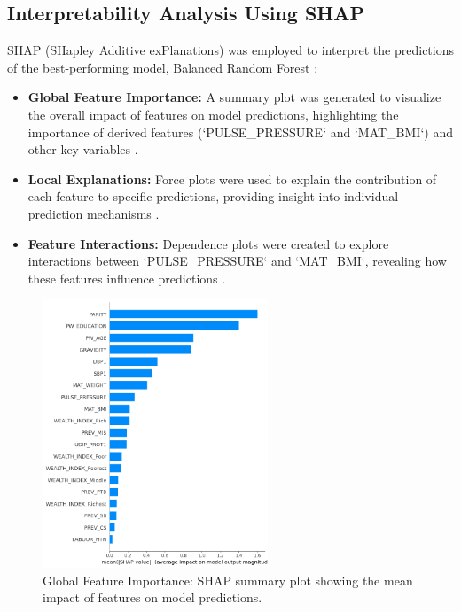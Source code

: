 \documentclass{article}
\begin{document}
\subsection{Interpretability Analysis Using SHAP}
SHAP (SHapley Additive exPlanations) was employed to interpret the predictions of the best-performing model, Balanced Random Forest \cite{wu2024}:
\begin{itemize}
    \item \textbf{Global Feature Importance:} A summary plot was generated to visualize the overall impact of features on model predictions, highlighting the importance of derived features (`PULSE\_PRESSURE` and `MAT\_BMI`) and other key variables \cite{setegn2024}.
    \item \textbf{Local Explanations:} Force plots were used to explain the contribution of each feature to specific predictions, providing insight into individual prediction mechanisms \cite{aljameel2023}.
    \item \textbf{Feature Interactions:} Dependence plots were created to explore interactions between `PULSE\_PRESSURE` and `MAT\_BMI`, revealing how these features influence predictions \cite{aftab2021}.
\end{itemize}

\begin{figure}[h]
    \centering
    \includegraphics[width=0.6\textwidth]{shap mean impact on model.png}
    \caption{Global Feature Importance: SHAP summary plot showing the mean impact of features on model predictions.}
    \label{fig:shap_summary}
\end{figure}
\end{document}
